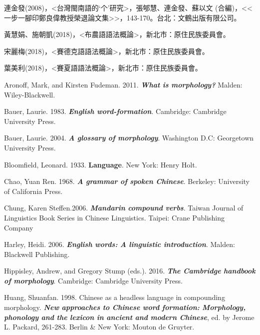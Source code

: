 \textrm{連金發(2008)，<台灣閩南語的‘个’研究>，張郇慧、連金發、蘇以文 (合編)，<<一步一腳印鄭良偉教授榮退論文集>>，143-170。台北：文鶴出版有限公司。}

\textrm{黃慧娟、施朝凱(2018)，<布農語語法概論>，新北市：原住民族委員會。}

\textrm{宋麗梅(2018)，<賽德克語語法概論>，新北市：原住民族委員會。}

\textrm{葉美利(2018)，<賽夏語語法概論>，新北市：原住民族委員會。}

\textrm{Aronoff, Mark, and Kirsten Fudeman. 2011.} \textrm{\textbf{\textit{What} \textit{is} \textit{morphology?}}} \textrm{Malden: Wiley-Blackwell.}

\textrm{Bauer, Laurie. 1983.} \textrm{\textbf{\textit{English} \textit{word-formation}}}\textrm{. Cambridge: Cambridge University Press.}

\textrm{Bauer, Laurie. 2004.} \textrm{\textbf{\textit{A} \textit{glossary} \textit{of} \textit{morphology}}}\textrm{. }\textrm{Washington D.C: Georgetown University Press.}

\textrm{Bloomfield, Leonard. 1933.}\textrm{\textbf{ \textbf{Language}}}\textrm{.} \textrm{New York: Henry Holt.}

\textrm{Chao, Yuan Ren. 1968.} \textrm{\textbf{\textit{A} \textit{grammar} \textit{of} \textit{spoken} \textit{Chinese}}}\textrm{. Berkeley: University of California Press.} 

\textrm{Chung, Karen Steffen.2006.}\textrm{ }\textrm{\textbf{\textit{Mandarin} \textit{compound} \textit{verbs}}}\textrm{. Taiwan Journal of Linguistics Book Series in Chinese Linguistics. Taipei: Crane Publishing Company}

\textrm{Harley, Heidi. 2006.}\textrm{ }\textrm{\textbf{\textit{English} \textit{words:} \textit{A} \textit{linguistic} \textit{introduction}}}\textrm{.} \textrm{Malden: Blackwell Publishing.}

\textrm{Hippisley, Andrew, and Gregory Stump (eds.). 2016.} \textrm{\textbf{\textit{The} \textit{Cambridge} \textit{handbook} \textit{of} \textit{morphology}}}\textrm{. Cambridge: Cambridge University Press.}

\textrm{Huang, Shuanfan. 1998. Chinese as a headless language in compounding morphology.} \textrm{\textbf{\textit{New} \textit{approaches} \textit{to} \textit{Chinese} \textit{word} \textit{formation:} \textit{Morphology,} \textit{phonology} \textit{and} \textit{the} \textit{lexicon} \textit{in} \textit{ancient} \textit{and} \textit{modern} \textit{Chinese}}}\textrm{, }\textrm{ed. by Jerome L. Packard, 261-283. Berlin \& New York: Mouton de Gruyter.}

